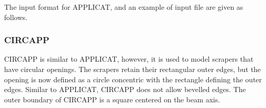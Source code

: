 \documentclass[12pt,twoside]{article}
\begin{document}
\clearpage

The input format for APPLICAT, and an example of input file are given as follows.

\begin{small}

\end{small}

\clearpage
\vspace*{-1cm}
\subsubsection{CIRCAPP}
\renewcommand{\rightmark}{CIRCAPP CM}

CIRCAPP is similar to APPLICAT, however, it is used to model scrapers that have
circular openings.  The scrapers retain their rectangular outer edges, but
the opening is now defined as a circle concentric with the rectangle
defining the outer edges.  Similar to APPLICAT, CIRCAPP does not allow
bevelled edges. The outer boundary of CIRCAPP is a square centered on the beam axis.
\end{document}

